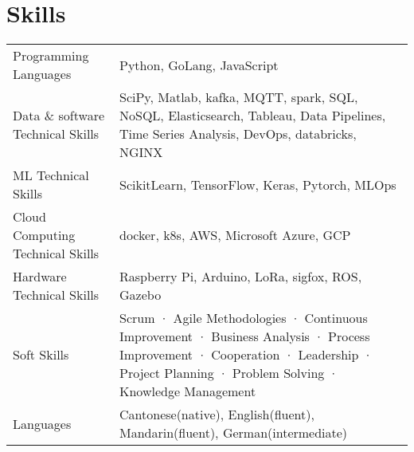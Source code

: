 \documentclass[a4paper,12pt]{article}
\begin{document}
\section{Skills}
\begin{tabularx}{\linewidth}{@{}l X@{}}
Programming Languages & \normalsize{Python, GoLang, JavaScript}\\
Data \& software Technical Skills &  \normalsize{SciPy, Matlab, kafka, MQTT, spark, SQL, NoSQL, Elasticsearch, Tableau, Data Pipelines, Time Series Analysis, DevOps, databricks, NGINX}\\
ML Technical Skills & \normalsize{ScikitLearn, TensorFlow, Keras, Pytorch, MLOps} \\
Cloud Computing Technical Skills &  \normalsize{docker, k8s, AWS, Microsoft Azure, GCP} \\
Hardware Technical Skills & \normalsize{Raspberry Pi, Arduino, LoRa, sigfox, ROS, Gazebo}\\
Soft Skills  &  \normalsize{Scrum · Agile Methodologies · Continuous Improvement · Business Analysis · Process Improvement · Cooperation · Leadership · Project Planning · Problem Solving · Knowledge Management}\\  
Languages & \normalsize{Cantonese(native), English(fluent), Mandarin(fluent), German(intermediate)}
\end{tabularx}

\vfill
{}
\end{document}
